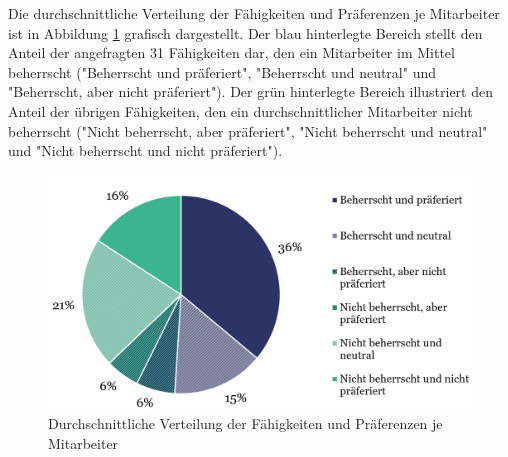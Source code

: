 Die durchschnittliche Verteilung der Fähigkeiten und Präferenzen je Mitarbeiter ist in Abbildung \ref{fig:ergebnisse:abb1} grafisch dargestellt.
Der blau hinterlegte Bereich stellt den Anteil der angefragten 31 Fähigkeiten dar, den ein Mitarbeiter im Mittel beherrscht ("Beherrscht und präferiert", "Beherrscht und neutral" und "Beherrscht, aber nicht präferiert").
Der grün hinterlegte Bereich illustriert den Anteil der übrigen Fähigkeiten, den ein durchschnittlicher Mitarbeiter nicht beherrscht ("Nicht beherrscht, aber präferiert", "Nicht beherrscht und neutral" und "Nicht beherrscht und nicht präferiert").

\begin{figure}
    \centering
	\includegraphics[width=1.0\textwidth]{gfx/verteilung-f-p.png}
	\caption[Durchschnittliche Verteilung der Fähigkeiten und Präferenzen je Mitarbeiter]{Durchschnittliche Verteilung der Fähigkeiten und Präferenzen je Mitarbeiter}
	\label{fig:ergebnisse:abb1}
\end{figure}

